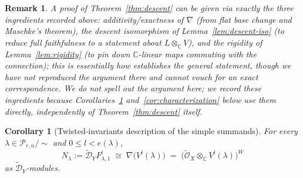 \documentclass[11pt,a4paper]{article}
\newtheorem{corollary}[theorem]{Corollary}
\newtheorem{remark}[theorem]{Remark}
\begin{document}
\begin{remark}
A proof of Theorem~\ref{thm:descent} can be given via exactly the
three ingredients recorded above: additivity/exactness of $\nabla$
(from flat base change and Maschke's theorem), the descent isomorphism
of Lemma~\ref{lem:descent-iso} (to reduce full faithfulness to a
statement about $L \otimes_{\mathbb{C}} V$), and the rigidity of
Lemma~\ref{lem:rigidity} (to pin down $\mathbb{C}$-linear maps
commuting with the connection); this is essentially how
\cite[\S 2.4]{Nonkane2019} establishes the general
statement, though we have not reproduced the argument there and
cannot vouch for an exact correspondence. We do not spell out the
argument here; we record these ingredients because
Corollaries~\ref{cor:twisted-invariants}
and~\ref{cor:characterization} below use them directly, independently
of Theorem~\ref{thm:descent} itself.
\end{remark}

\begin{corollary}[Twisted-invariants description of the simple summands]\label{cor:twisted-invariants}
For every $\lambda \in \mathcal{P}_{r,n}/\sim$ and $0 \le l < e(\lambda)$,
\[
  N_\lambda := \widetilde{\mathcal{D}}_Y F^l_{\lambda,1}
  \;\cong\; \nabla\big(V^l(\lambda)\big)
  \;=\; \big(\widetilde{\mathcal{O}}_X \otimes_{\mathbb{C}} V^l(\lambda)\big)^{W}
\]
as $\widetilde{\mathcal{D}}_Y$-modules.
\end{corollary}
\end{document}
